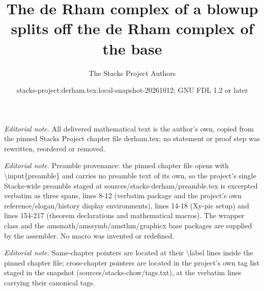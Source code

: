 \documentclass[10pt,a4paper]{amsart}
\title{The de Rham complex of a blowup splits off the de Rham complex of the base}
\author{The Stacks Project Authors}
\date{stacks-project:derham.tex:local-snapshot-20261012; GNU FDL 1.2 or later}
\theoremstyle{plain}
\theoremstyle{definition}
\theoremstyle{remark}
\numberwithin{equation}{subsection}
\begin{document}
\maketitle
\noindent\textit{Editorial note.} All delivered mathematical text is the author's own, copied from the pinned Stacks Project chapter file derham.tex; no statement or proof step was rewritten, reordered or removed.\par\medskip
\noindent\textit{Editorial note.} Preamble provenance: the pinned chapter file opens with \textbackslash{}input\{preamble\} and carries no preamble text of its own, so the project's single Stacks-wide preamble staged at sources/stacks-derham/preamble.tex is excerpted verbatim as three spans, lines 8-12 (verbatim package and the project's own reference/slogan/history display environments), lines 14-18 (Xy-pic setup) and lines 154-217 (theorem declarations and mathematical macros). The wrapper class and the amsmath/amssymb/amsthm/graphicx base packages are supplied by the assembler. No macro was invented or redefined.\par\medskip
\noindent\textit{Editorial note.} Same-chapter pointers are located at their \textbackslash{}label lines inside the pinned chapter file; cross-chapter pointers are located in the project's own tag list staged in the snapshot (sources/stacks-chow/tags.txt), at the verbatim lines carrying their canonical tags.\par\medskip
\end{document}
